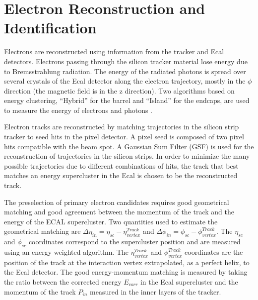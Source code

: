 \section{Electron Reconstruction and Identification}


\label{eID}

Electrons are reconstructed using information from the  tracker and Ecal detectors. Electrons
passing through the  silicon tracker material lose energy due to Bremsstrahlung  radiation. The
energy of the radiated photons is spread  over several crystals of the Ecal detector along the 
electron trajectory, mostly in the $\phi$ direction  (the magnetic field is in the z direction).
Two algorithms  based on energy clustering, ``Hybrid'' for the barrel and  ``Island'' for the
endcaps, are used to measure the energy  of electrons and photons \cite{eRecoCMS}.

Electron tracks are reconstructed by matching trajectories  in the silicon strip tracker to seed
hits in the pixel  detector. A pixel seed is composed of two pixel hits  compatible with the beam
spot. A Gaussian Sum Filter (GSF)  is used for the reconstruction of trajectories in the  silicon
strips. In order to minimize the many possible  trajectories due to different combinations of hits,
the  track that best matches an energy supercluster in the Ecal  is chosen to be the reconstructed
track.

The preselection of primary electron candidates requires  good geometrical matching and good
agreement between the  momentum of the track and the energy of the ECAL  supercluster. Two
quantities used to estimate the geometrical matching are $\Delta \eta_{in} = \eta_{sc}
-\eta^{Track}_{vertex}$ and  $\Delta \phi_{in} = \phi_{sc} -\phi^{Track}_{vertex}$. The $\eta_{sc}$
and $\phi_{sc}$ coordinates correspond to  the supercluster position and are measured using an
energy weighted algorithm. The $\eta^{Track}_{vertex}$ and  $\phi^{Track}_{vertex}$ coordinates are
the position of the track at the interaction vertex extrapolated,  as a perfect helix, to the Ecal
detector. The good energy-momentum matching is measured by taking the ratio  between the corrected
energy $E_{corr}$ in the Ecal  supercluster and the momentum of the track $P_{in}$  measured in the
inner layers of the tracker.

